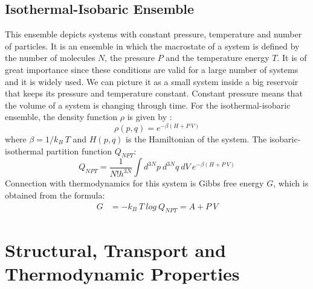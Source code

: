 \subsection{Isothermal-Isobaric  Ensemble} 
This ensemble depicts systems with constant pressure, temperature and number of particles. It is an ensemble in which  the macrostate of a system is defined by the number of molecules $N$, the pressure $P$ and the temperature energy $T$. It is of great importance since these conditions are valid for a large number of systems and it is widely used. We can picture it as a small system inside a big reservoir that keeps its pressure and temperature constant. Constant pressure means that the volume of a system is changing through time. For the isothermal-isobaric ensemble, the density function $\rho $ is given by \citep{Allen1989}: 
\begin{equation}
\rho (p, q) = e^{-\beta(H + P~V)} 
\end{equation} 
where $\beta = 1/k_B~T$ and $H(p, q)$ is the Hamiltonian of the system. The isobaric-isothermal   partition function $Q_{NPT}$:
\begin{equation}
Q_{NPT} = \frac {1}{N! h^{3N}} \int d^{3N}p~ d^{3N}q ~dV ~ e^{-\beta(H + P~V)}  
\end{equation} 
Connection with thermodynamics for this system is Gibbs free energy $G$, which is obtained from the formula: 
\begin{align}
G & = - k_B~T~log~Q_{NPT} = A + P~V
\end{align}
\section{Structural, Transport and Thermodynamic Properties}

